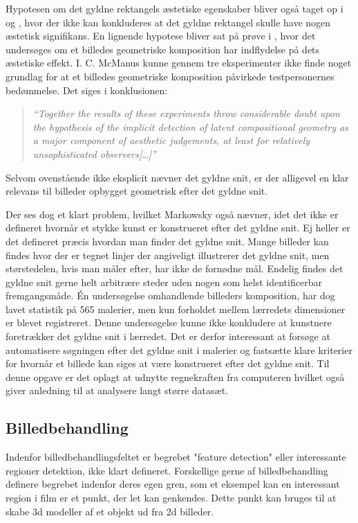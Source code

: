{Hypotesen om det gyldne rektangels æstetiske egenskaber bliver også
taget op i \cite{Boselie1984} og \cite{Plug1980}, hvor der ikke kan
konkluderes at det gyldne rektangel skulle have nogen æstetisk
signifikans. En lignende hypotese bliver sat på prøve i
\cite{McManus1995}, hvor det undersøges om et billedes geometriske
komposition har indflydelse på dets æstetiske effekt. I. C. McManus
kunne gennem tre eksperimenter ikke finde noget grundlag for at et
billedes geometriske komposition påvirkede testpersonernes bedømmelse.
Det siges i konklusionen:

\begin{quote}
	\emph{``Together the results of these experiments throw
	considerable doubt upon the hypothesis of the implicit detection
	of latent compositional geometry as a major component of
	aesthetic judgements, at least for relatively unsophisticated
	observers[\dots]''}
\end{quote}

Selvom ovenstående ikke eksplicit nævner det gyldne snit, er der
alligevel en klar relevans til billeder opbygget geometrisk efter det
gyldne snit. 

Der ses dog et klart problem, hvilket Markowsky også nævner, idet det
ikke er defineret hvornår et stykke kunst er konstrueret efter det
gyldne snit. Ej heller er det defineret præcis hvordan man finder det
gyldne snit. Mange billeder kan findes hvor der er tegnet linjer der
angiveligt illustrerer det gyldne snit, men størstedelen, hvis man måler
efter, har ikke de fornødne mål. Endelig findes det gyldne snit gerne
helt arbitrære steder uden nogen som helst identificerbar
fremgangsmåde. Én undersøgelse omhandlende billeders komposition, har
dog lavet statistik på 565 malerier, men kun forholdet mellem lærredets
dimensioner er blevet registreret\cite{Olariu1999}. Denne undersøgelse
kunne ikke konkludere at kunstnere foretrækker det gyldne snit i
lærredet. Det er derfor interessant at forsøge at automatisere søgningen
efter det gyldne snit i malerier og fastsætte klare kriterier for
hvornår et billede kan siges at være konstrueret efter det gyldne snit.
Til denne opgave er det oplagt at udnytte regnekraften fra computeren
hvilket også giver anledning til  at analysere langt større datasæt.

\subsection{Billedbehandling}
Indenfor billedbehandlingsfeltet er begrebet "feature detection" eller
interessante regioner detektion, ikke klart defineret.
Forskellige gerne af billedbehandling definere begrebet indenfor
deres egen gren, som et eksempel kan en interessant region i film
er et punkt, der let kan genkendes.
Dette punkt kan bruges til at skabe 3d modeller af et objekt ud fra 2d billeder.

}
